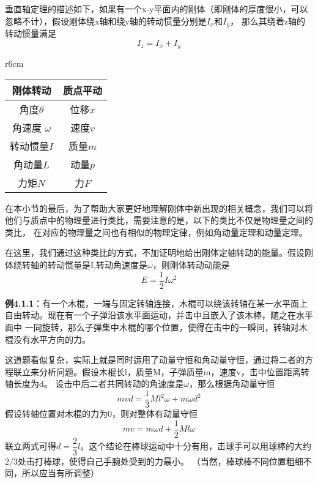 \documentclass{article}
\begin{document}
    垂直轴定理的描述如下，如果有一个x-y平面内的刚体（即刚体的厚度很小，可以忽略不计），假设刚体绕x轴和绕y轴的转动惯量分别是\(I_x\)和\(I_y\)，
    那么其绕着z轴的转动惯量满足
    \begin{equation*}
        I_z = I_x + I_y
    \end{equation*}

    \begin{wraptable}{r}{6cm} 
        \centering
        \begin{tabular}{|c|c|}
            \hline
            \textbf{刚体转动} & \textbf{质点平动} \\ \hline
            角度$ \theta$            & 位移$ x$            \\ \hline
            角速度 $ \omega$          & 速度$ v$            \\ \hline
            转动惯量$ I$          & 质量$ m$            \\ \hline
            角动量$ L$           & 动量$ p$            \\ \hline
            力矩$ N$            & 力$ F$            \\ \hline
        \end{tabular}
    \end{wraptable}
    在本小节的最后，为了帮助大家更好地理解刚体中新出现的相关概念，我们可以将他们与质点中的物理量进行类比，需要注意的是，以下的类比不仅是物理量之间的类比，
    在对应的物理量之间也有相似的物理定律，例如角动量定理和动量定理。

    在这里，我们通过这种类比的方式，不加证明地给出刚体定轴转动的能量。假设刚体绕转轴的转动惯量是I,转动角速度是\(\omega\)，则刚体转动动能是
    \begin{equation*}
        E = \frac{1}{2} I \omega^2
    \end{equation*}

    \textbf{例4.1.1}：有一个木棍，一端与固定转轴连接，木棍可以绕该转轴在某一水平面上自由转动。现在有一个子弹沿该水平面运动，并击中且嵌入了该木棒，随之在水平面中
    一同旋转，那么子弹集中木棍的哪个位置，使得在击中的一瞬间，转轴对木棍没有水平方向的力。

    这道题看似复杂，实际上就是同时运用了动量守恒和角动量守恒，通过将二者的方程联立来分析问题。假设木棍长l，质量M，子弹质量m，速度v，击中位置距离转轴长度为d。
    设击中后二者共同转动的角速度是\(\omega\)，那么根据角动量守恒
    \begin{equation*}
        mvd = \frac{1}{3}Ml^2 \omega + m\omega d^2
    \end{equation*}
    假设转轴位置对木棍的力为0，则对整体有动量守恒
    \begin{equation*}
        mv = m\omega d + \frac{1}{2}Ml \omega
    \end{equation*}
    联立两式可得\(d=\dfrac{2}{3}l\)。这个结论在棒球运动中十分有用，击球手可以用球棒的大约2/3处击打棒球，使得自己手腕处受到的力最小。
    （当然，棒球棒不同位置粗细不同，所以应当有所调整）
\end{document}
